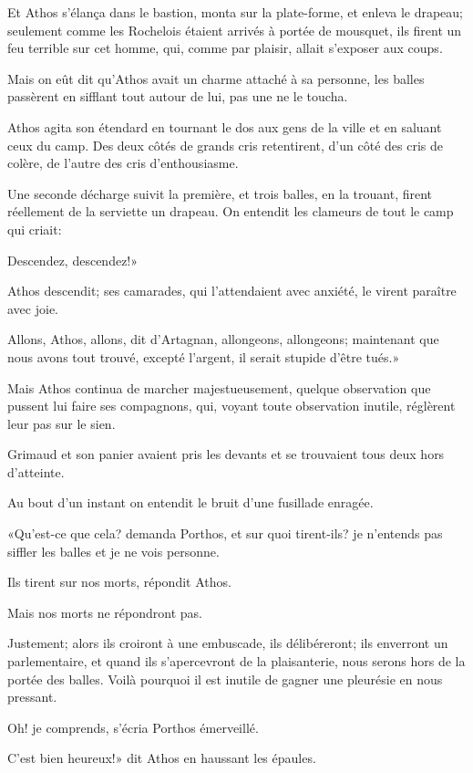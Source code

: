 Et Athos s'élança dans le bastion, monta sur la plate-forme, et enleva le drapeau; seulement comme les Rochelois étaient arrivés à portée de mousquet, ils firent un feu terrible sur cet homme, qui, comme par plaisir, allait s'exposer aux coups. 

Mais on eût dit qu'Athos avait un charme attaché à sa personne, les balles passèrent en sifflant tout autour de lui, pas une ne le toucha. 

Athos agita son étendard en tournant le dos aux gens de la ville et en saluant ceux du camp. Des deux côtés de grands cris retentirent, d'un côté des cris de colère, de l'autre des cris d'enthousiasme. 

Une seconde décharge suivit la première, et trois balles, en la trouant, firent réellement de la serviette un drapeau. On entendit les clameurs de tout le camp qui criait: 

\speak  Descendez, descendez!» 

Athos descendit; ses camarades, qui l'attendaient avec anxiété, le virent paraître avec joie. 

\speak  Allons, Athos, allons, dit d'Artagnan, allongeons, allongeons; maintenant que nous avons tout trouvé, excepté l'argent, il serait stupide d'être tués.» 

Mais Athos continua de marcher majestueusement, quelque observation que pussent lui faire ses compagnons, qui, voyant toute observation inutile, réglèrent leur pas sur le sien. 

Grimaud et son panier avaient pris les devants et se trouvaient tous deux hors d'atteinte. 

Au bout d'un instant on entendit le bruit d'une fusillade enragée. 

«Qu'est-ce que cela? demanda Porthos, et sur quoi tirent-ils? je n'entends pas siffler les balles et je ne vois personne. 

\speak  Ils tirent sur nos morts, répondit Athos. 

\speak  Mais nos morts ne répondront pas. 

\speak  Justement; alors ils croiront à une embuscade, ils délibéreront; ils enverront un parlementaire, et quand ils s'apercevront de la plaisanterie, nous serons hors de la portée des balles. Voilà pourquoi il est inutile de gagner une pleurésie en nous pressant. 

\speak  Oh! je comprends, s'écria Porthos émerveillé. 

\speak  C'est bien heureux!» dit Athos en haussant les épaules. 

